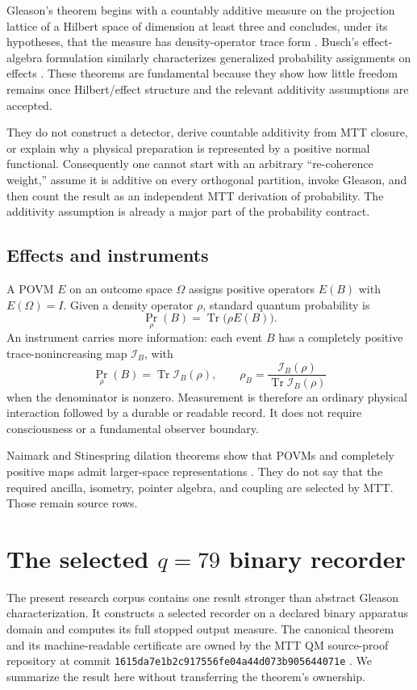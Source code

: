\documentclass[11pt]{article}
\theoremstyle{definition}
\theoremstyle{remark}
\newcommand{\cI}{\mathcal I}
\newcommand{\Tr}{\operatorname{Tr}}
\begin{document}
Gleason's theorem begins with a countably additive measure on the projection
lattice of a Hilbert space of dimension at least three and concludes, under
its hypotheses, that the measure has density-operator trace form
\cite{Gleason1957}.  Busch's effect-algebra formulation similarly
characterizes generalized probability assignments on effects
\cite{Busch2003}.  These theorems are fundamental because they show how
little freedom remains once Hilbert/effect structure and the relevant
additivity assumptions are accepted.

They do not construct a detector, derive countable additivity from MTT
closure, or explain why a physical preparation is represented by a positive
normal functional.  Consequently one cannot start with an arbitrary
``re-coherence weight,'' assume it is additive on every orthogonal
partition, invoke Gleason, and then count the result as an independent MTT
derivation of probability.  The additivity assumption is already a major
part of the probability contract.

\subsection{Effects and instruments}

A POVM \(E\) on an outcome space \(\Omega\) assigns positive operators
\(E(B)\) with \(E(\Omega)=I\).  Given a density operator \(\rho\), standard
quantum probability is
\[
\Pr_\rho(B)=\Tr\bigl(\rho E(B)\bigr).
\]
An instrument carries more information: each event \(B\) has a completely
positive trace-nonincreasing map \(\cI_B\), with
\[
\Pr_\rho(B)=\Tr\cI_B(\rho),
\qquad
\rho_B
=\frac{\cI_B(\rho)}{\Tr\cI_B(\rho)}
\]
when the denominator is nonzero.  Measurement is therefore an ordinary
physical interaction followed by a durable or readable record.  It does not
require consciousness or a fundamental observer boundary.

Naimark and Stinespring dilation theorems show that POVMs and completely
positive maps admit larger-space representations
\cite{Naimark1940,Stinespring1955}.  They do not say that the required
ancilla, isometry, pointer algebra, and coupling are selected by MTT.  Those
remain source rows.

\section{The selected \texorpdfstring{\(q=79\)}{q=79} binary recorder}
\label{sec:q79}

The present research corpus contains one result stronger than abstract
Gleason characterization.  It constructs a selected recorder on a declared
binary apparatus domain and computes its full stopped output measure.  The
canonical theorem and its machine-readable certificate are owned by the
MTT QM source-proof repository at commit
\texttt{1615da7e1b2c917556fe04a44d073b905644071e}
\cite{Q79Recorder2026}.  We summarize the result here without transferring
the theorem's ownership.
\end{document}
